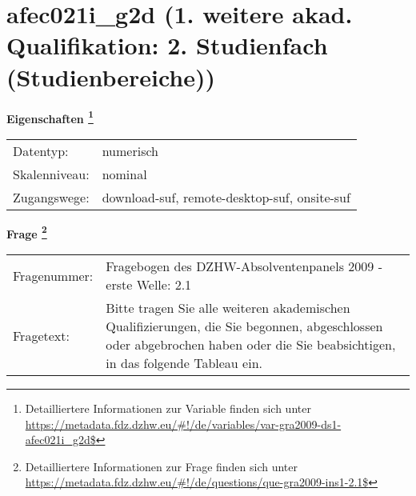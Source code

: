 
    \setcounter{footnote}{0}

    \vspace*{-1.8cm}
	\section{afec021i\_g2d (1. weitere akad. Qualifikation: 2. Studienfach (Studienbereiche))}
	\label{section:afec021i_g2d}



    \vspace*{0.5cm}
    \noindent\textbf{Eigenschaften
	\footnote{Detailliertere Informationen zur Variable finden sich unter
		\url{https://metadata.fdz.dzhw.eu/\#!/de/variables/var-gra2009-ds1-afec021i_g2d$}}}\\
	\begin{tabularx}{\hsize}{@{}lX}
	Datentyp: & numerisch \\
	Skalenniveau: & nominal \\
	Zugangswege: &
	  download-suf, 
	  remote-desktop-suf, 
	  onsite-suf
 \\
    \end{tabularx}



				\vspace*{0.5cm}
                \noindent\textbf{Frage
	                \footnote{Detailliertere Informationen zur Frage finden sich unter
		              \url{https://metadata.fdz.dzhw.eu/\#!/de/questions/que-gra2009-ins1-2.1$}}}\\
				\begin{tabularx}{\hsize}{@{}lX}
					Fragenummer: &
					  Fragebogen des DZHW-Absolventenpanels 2009 - erste Welle:
					  2.1
 \\
					Fragetext: & Bitte tragen Sie alle weiteren akademischen Qualifizierungen, die Sie begonnen, abgeschlossen oder abgebrochen haben oder die Sie beabsichtigen, in das folgende Tableau ein. \\
				\end{tabularx}





